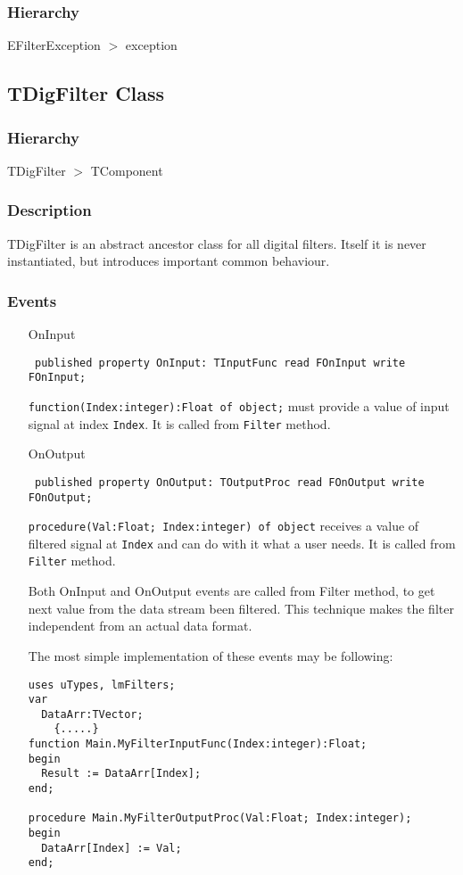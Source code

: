 \documentclass[12pt,a4paper,oneside]{report}
\newcommand{\declarationitem}[1]{{\addfontfeatures{FakeBold=1.3} #1}}
\newcommand{\code}[1]{\texttt{#1}}
\begin{document}
\subsubsection{Hierarchy}
EFilterException {$>$} exception
\subsection{TDigFilter Class}
\label{lmfilters.TDigFilter}
\subsubsection{Hierarchy}
TDigFilter {$>$} TComponent
\subsubsection{Description}
TDigFilter is an abstract ancestor class for all digital filters. Itself it is never instantiated, but introduces important common behaviour. 
\subsubsection{Events}
\begin{itemize}\label{lmfilters.TDigFilter-OnInput}
	\item[\declarationitem{OnInput}\hfill]
	\begin{flushleft}
		\code{
			published property OnInput: TInputFunc read FOnInput write FOnInput;}
	\end{flushleft}
	\par \code{function(Index:integer):Float of object;} must provide a value of input signal at index \code{Index}. It is called from \code{Filter}\label{lmfilters.TDigFilter-OnOutput} method.
	\item[\declarationitem{OnOutput}\hfill]
	\begin{flushleft}
		\code{
			published property OnOutput: TOutputProc read FOnOutput write FOnOutput;}
	\end{flushleft}
	\par \code{procedure(Val:Float; Index:integer) of object} receives a value of filtered signal at \code{Index} and can do with it what a user needs. It is called from \code{Filter} method.

	Both OnInput and OnOutput events are called from Filter method, to get next value from the data stream been filtered. This technique makes the filter independent from an actual data format.

	The most simple implementation of these events may be following:
\begin{verbatim}
uses uTypes, lmFilters;
var
  DataArr:TVector;
	{.....}
function Main.MyFilterInputFunc(Index:integer):Float;
begin
  Result := DataArr[Index];
end;

procedure Main.MyFilterOutputProc(Val:Float; Index:integer);
begin
  DataArr[Index] := Val;
end;
\end{verbatim}

\end{itemize}
\end{document}

